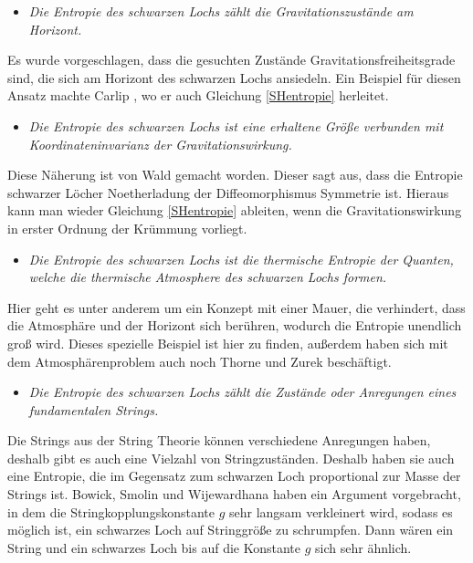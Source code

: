 \documentclass[ngerman]{scrartcl}
\begin{document}
	\begin{itemize}
		\item [~] \textit{Die Entropie des schwarzen Lochs zählt die Gravitationszustände am Horizont.}
	\end{itemize}
	Es wurde vorgeschlagen, dass die gesuchten Zustände Gravitationsfreiheitsgrade sind, die sich am Horizont des schwarzen Lochs ansiedeln. Ein Beispiel für diesen Ansatz machte Carlip \cite{Carlip}, wo er auch Gleichung \eqref{SHentropie} herleitet.
	
	\begin{itemize} 
		\item [~] \textit{Die Entropie des schwarzen Lochs ist eine erhaltene Größe verbunden mit Koordinateninvarianz der Gravitationswirkung.}
	\end{itemize}
	Diese Näherung ist von Wald \cite{Wald} gemacht worden. Dieser sagt aus, dass die Entropie schwarzer Löcher Noetherladung der Diffeomorphismus Symmetrie ist.  Hieraus kann man wieder Gleichung \eqref{SHentropie} ableiten, wenn die Gravitationswirkung in erster Ordnung der Krümmung vorliegt. 
	
	\begin{itemize}
		\item [~] \textit{Die Entropie des schwarzen Lochs ist die thermische Entropie der Quanten, welche die thermische Atmosphere des schwarzen Lochs formen.}
	\end{itemize}
	Hier geht es unter anderem um ein Konzept mit einer Mauer, die verhindert, dass die Atmosphäre und der Horizont sich berühren, wodurch die Entropie unendlich groß wird.  Dieses spezielle Beispiel ist hier \cite{Hooft} zu finden, außerdem haben sich mit dem Atmosphärenproblem auch noch Thorne und Zurek \cite{ThorneZurek} beschäftigt.
	
	\begin{itemize}
		\item [~] \textit{Die Entropie des schwarzen Lochs zählt die Zustände oder Anregungen eines fundamentalen Strings.}
	\end{itemize}
	Die Strings aus der String Theorie können verschiedene Anregungen haben, deshalb gibt es auch eine Vielzahl von Stringzuständen. Deshalb haben sie auch eine Entropie, die im Gegensatz zum schwarzen Loch proportional zur Masse der Strings ist. Bowick, Smolin und Wijewardhana \cite{BowickSmolinWijewardhana} haben ein Argument vorgebracht, in dem die Stringkopplungskonstante $g$ sehr langsam verkleinert wird, sodass es möglich ist, ein schwarzes Loch auf Stringgröße zu schrumpfen. Dann wären ein String und ein schwarzes Loch bis auf die Konstante $g$ sich sehr ähnlich.
	
\end{document}
